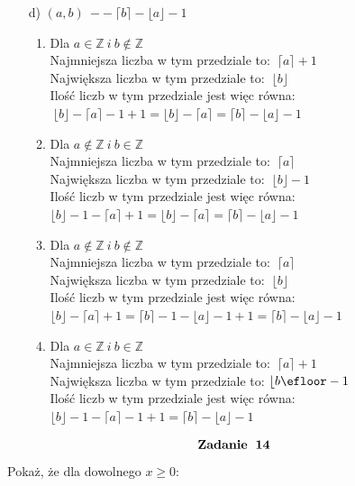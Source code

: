 \documentclass[fleqn]{article}
\begin{document}
\begin{itemize}
  \item[d)]$(a,b) \ -- \ \lceil b \rceil -\lfloor a\rfloor - 1$ \\
  \begin{enumerate}
	\item Dla $a\in\mathbb{Z} \ i \ b\notin\mathbb{Z} $\\
		 Najmniejsza liczba w tym przedziale to: $\ \lceil a\rceil +1 $\\
         Największa liczba w tym przedziale to: $\ \lfloor b \rfloor $\\
         Ilość liczb w tym przedziale jest więc równa:$\ \lfloor b \rfloor - \lceil a\rceil -1+1=\lfloor b\rfloor-\lceil a\rceil = \lceil b\rceil -\lfloor a\rfloor -1$ \\
	\item Dla $a\notin\mathbb{Z} \ i \ b\in\mathbb{Z} $\\
		 Najmniejsza liczba w tym przedziale to: $\ \lceil a\rceil $\\
         Największa liczba w tym przedziale to: $\ \lfloor b \rfloor -1$\\
         Ilość liczb w tym przedziale jest więc równa:$\lfloor b \rfloor - 1 - \lceil a\rceil +1=\lfloor b\rfloor-\lceil a\rceil = \lceil b\rceil -\lfloor a\rfloor -1$ \\
     \item Dla $a\notin\mathbb{Z} \ i \ b\notin\mathbb{Z} $\\
		 Najmniejsza liczba w tym przedziale to: $\ \lceil a\rceil $\\
         Największa liczba w tym przedziale to: $\ \lfloor b \rfloor $\\
         Ilość liczb w tym przedziale jest więc równa:$\lfloor b \rfloor  - \lceil a\rceil +1=\lceil b\rceil-1-\lfloor a\rfloor-1+1 = \lceil b\rceil -\lfloor a\rfloor -1$ \\
     \item Dla $a\in\mathbb{Z} \ i \ b\in\mathbb{Z} $\\
		 Najmniejsza liczba w tym przedziale to: $\ \lceil a\rceil +1 $\\
         Największa liczba w tym przedziale to: $ \lfloor b \efloor -1$\\
         Ilość liczb w tym przedziale jest więc równa:$\lfloor b \rfloor  -1- \lceil a\rceil-1 +1 = \lceil b\rceil -\lfloor a\rfloor -1$\\
\end{enumerate}
  \end{itemize}  
\[\huge \bf Zadanie \ 14\] 
Pokaż, że dla dowolnego $x\geq0$: \\ \\
\end{document}
